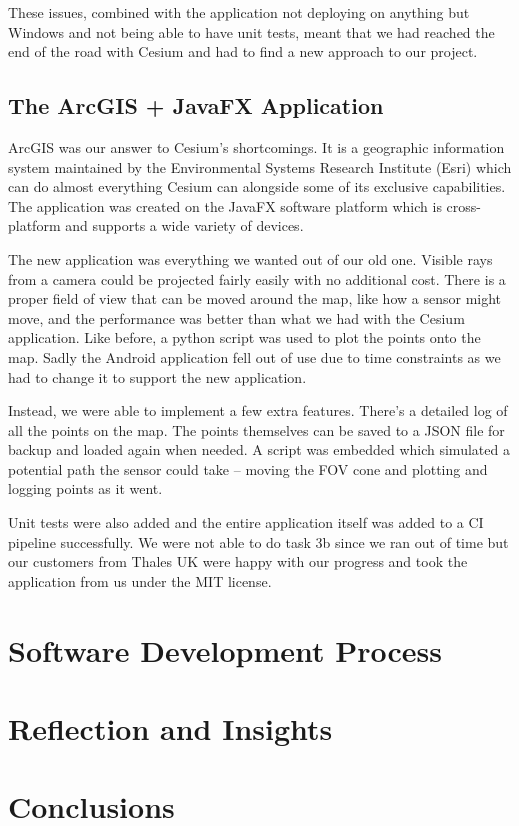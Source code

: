 \documentclass{l3proj}
\begin{document}
These issues, combined with the application not deploying on anything but Windows and not being able to have unit tests, meant that we had reached the end of the road with Cesium and had to find a new approach to our project.

\subsection{The ArcGIS + JavaFX Application}

ArcGIS was our answer to Cesium’s shortcomings. It is a geographic information system maintained by the Environmental Systems Research Institute (Esri) which can do almost everything Cesium can alongside some of its exclusive capabilities. The application was created on the JavaFX software platform which is cross-platform and supports a wide variety of devices.

The new application was everything we wanted out of our old one. Visible rays from a camera could be projected fairly easily with no additional cost. There is a proper field of view that can be moved around the map, like how a sensor might move, and the performance was better than what we had with the Cesium application. Like before, a python script was used to plot the points onto the map. Sadly the Android application fell out of use due to time constraints as we had to change it to support the new application.

Instead, we were able to implement a few extra features. There’s a detailed log of all the points on the map. The points themselves can be saved to a JSON file for backup and loaded again when needed. A script was embedded which simulated a potential path the sensor could take – moving the FOV cone and plotting and logging points as it went.

Unit tests were also added and the entire application itself was added to a CI pipeline successfully. We were not able to do task 3b since we ran out of time but our customers from Thales UK were happy with our progress and took the application from us under the MIT license.


\section{Software Development Process}


\section{Reflection and Insights}


\section{Conclusions}





\end{document}
